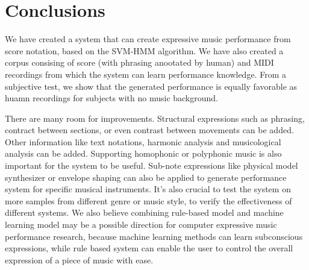 \chapter{Conclusions}

We have created a system that can create expressive music performance from score notation, based on the SVM-HMM algorithm. We have also created a corpus consising of score (with phrasing anootated by human) and MIDI recordings from which the system can learn performance knowledge. From a subjective test, we show that the generated performance is equally favorable as huamn recordings for subjects with no music background. 

There are many room for improvements. Structural expressions such as phrasing, contract between sections, or even contrast between movements can be added. Other information like text notations, harmonic analysis and musicological analysis can be added. Supporting homophonic or polyphonic music is also important for the system to be useful. Sub-note expressions like physical model synthesizer or envelope shaping can also be applied to generate performance system for specific musical instruments.  It's also crucial to test the system on more samples from different genre or music style, to verify the effectiveness of different systems. We also believe combining rule-based model and machine learning model may be a possible direction for computer expressive music performance research, because machine learning methods can learn subconscious expressions, while rule based system can enable the user to control the overall expression of a piece of music with ease.


